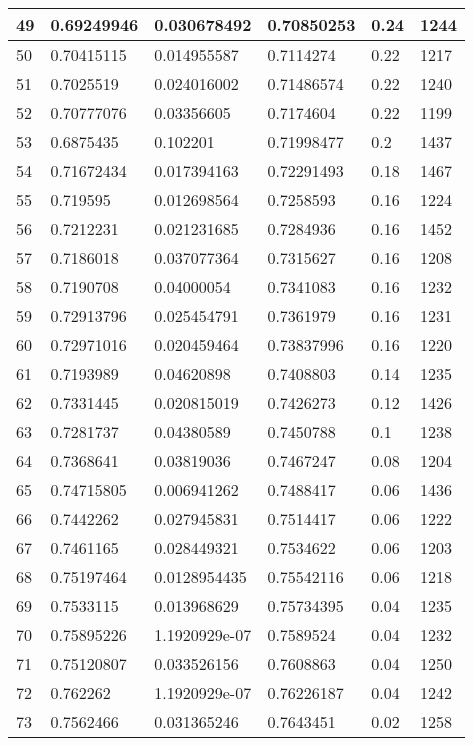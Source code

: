\begin{longtable}{|l|l|l|l|l|l|}
49 & 0.69249946 & 0.030678492 & 0.70850253 & 0.24 & 1244 \\ \hline 
50 & 0.70415115 & 0.014955587 & 0.7114274 & 0.22 & 1217 \\ \hline 
51 & 0.7025519 & 0.024016002 & 0.71486574 & 0.22 & 1240 \\ \hline 
52 & 0.70777076 & 0.03356605 & 0.7174604 & 0.22 & 1199 \\ \hline 
53 & 0.6875435 & 0.102201 & 0.71998477 & 0.2 & 1437 \\ \hline 
54 & 0.71672434 & 0.017394163 & 0.72291493 & 0.18 & 1467 \\ \hline 
55 & 0.719595 & 0.012698564 & 0.7258593 & 0.16 & 1224 \\ \hline 
56 & 0.7212231 & 0.021231685 & 0.7284936 & 0.16 & 1452 \\ \hline 
57 & 0.7186018 & 0.037077364 & 0.7315627 & 0.16 & 1208 \\ \hline 
58 & 0.7190708 & 0.04000054 & 0.7341083 & 0.16 & 1232 \\ \hline 
59 & 0.72913796 & 0.025454791 & 0.7361979 & 0.16 & 1231 \\ \hline 
60 & 0.72971016 & 0.020459464 & 0.73837996 & 0.16 & 1220 \\ \hline 
61 & 0.7193989 & 0.04620898 & 0.7408803 & 0.14 & 1235 \\ \hline 
62 & 0.7331445 & 0.020815019 & 0.7426273 & 0.12 & 1426 \\ \hline 
63 & 0.7281737 & 0.04380589 & 0.7450788 & 0.1 & 1238 \\ \hline 
64 & 0.7368641 & 0.03819036 & 0.7467247 & 0.08 & 1204 \\ \hline 
65 & 0.74715805 & 0.006941262 & 0.7488417 & 0.06 & 1436 \\ \hline 
66 & 0.7442262 & 0.027945831 & 0.7514417 & 0.06 & 1222 \\ \hline 
67 & 0.7461165 & 0.028449321 & 0.7534622 & 0.06 & 1203 \\ \hline 
68 & 0.75197464 & 0.0128954435 & 0.75542116 & 0.06 & 1218 \\ \hline 
69 & 0.7533115 & 0.013968629 & 0.75734395 & 0.04 & 1235 \\ \hline 
70 & 0.75895226 & 1.1920929e-07 & 0.7589524 & 0.04 & 1232 \\ \hline 
71 & 0.75120807 & 0.033526156 & 0.7608863 & 0.04 & 1250 \\ \hline 
72 & 0.762262 & 1.1920929e-07 & 0.76226187 & 0.04 & 1242 \\ \hline 
73 & 0.7562466 & 0.031365246 & 0.7643451 & 0.02 & 1258 \\ \hline 

\end{longtable}
